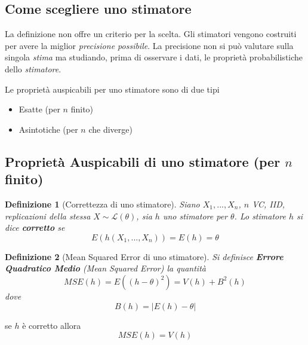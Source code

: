 \documentclass[
  11pt,
]{book}
\providecommand{\tightlist}{%
  \setlength{\itemsep}{0pt}\setlength{\parskip}{0pt}}
\theoremstyle{mytheoremstyle}
\theoremstyle{mydefstyle}
\newtheorem{definition}{Definizione}[section]
\begin{document}
\subsection{Come scegliere uno stimatore}\label{come-scegliere-uno-stimatore}

La definizione non offre un criterio per la scelta.
Gli stimatori vengono costruiti per avere la miglior \emph{precisione possibile}.
La precisione non si può valutare sulla singola \emph{stima} ma studiando,
prima di osservare i dati, le proprietà probabilistiche dello \emph{stimatore}.

Le proprietà auspicabili per uno stimatore sono di due tipi

\begin{itemize}
\tightlist
\item
  Esatte (per \(n\) finito)
\item
  Asintotiche (per \(n\) che diverge)
\end{itemize}

\subsection{\texorpdfstring{Proprietà Auspicabili di uno stimatore (per \(n\) finito)}{Proprietà Auspicabili di uno stimatore (per n finito)}}\label{proprietuxe0-auspicabili-di-uno-stimatore-per-n-finito}

\begin{info}

\begin{definition}[Correttezza di uno stimatore]
Siano \(X_1,...,X_n\), \(n\) VC, IID, replicazioni della stessa \(X\sim\mathscr{L}(\theta)\), sia \(h\) uno stimatore per \(\theta\).
Lo stimatore \(h\) si dice \textbf{corretto} se
\[E(h(X_1,...,X_n))=E(h)=\theta\]
\end{definition}

\end{info}

\begin{info}

\begin{definition}[Mean Squared Error di uno stimatore]
Si definisce \textbf{Errore Quadratico Medio} (\emph{Mean Squared Error}) la quantità
\[MSE(h)=E((h-\theta)^2)=V(h)+B^2(h)\]
dove
\[B(h)=|E(h)-\theta|\]
\end{definition}

\end{info}

se \(h\) è corretto allora
\[MSE(h)=V(h)\]
\end{document}
